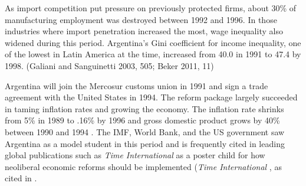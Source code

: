 \documentclass[a4paper]{article}\usepackage[]{graphicx}\usepackage[]{color}
\begin{document}
As import competition put pressure on previously protected firms, about 30\% of manufacturing employment was destroyed between 1992 and 1996. In those industries where import penetration increased the most, wage inequality also widened during this period. Argentina's Gini coefficient for income inequality, one of the lowest in Latin America at the time, increased from 40.0 in 1991 to 47.4 by 1998. (Galiani and Sanguinetti 2003, 505; Beker 2011, 11)

Argentina will join the Mercosur customs union in 1991 and sign a trade agreement with the United States in 1994. The reform package largely succeeded in taming inflation rates and growing the economy. The inflation rate shrinks from 5\% in 1989 to .16\% by 1996 and gross domestic product grows by 40\% between 1990 and 1994 \parencite[4]{Beker:2011vq}. The IMF, World Bank, and the US government saw Argentina as a model student in this period \parencites[142]{Cavallo:2004bf}{Cavallo:2004ta}[167]{Klein:2002vg} and is frequently cited in leading global publications such as \emph{Time International} as a poster child for how neoliberal economic reforms should be implemented (\emph{Time International} \cite*{:3GmqDB3y}, as cited in \cites[194]{Echegaray:2001tf}{MarcusDelgado:2003gn}{Silverstein:2002wm}.
\end{document}

